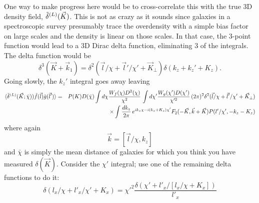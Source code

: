 \documentclass[prd,amsmath,amssymb,floatfix,superscriptaddress,nofootinbib]{revtex4-1}
\def\be{\begin{equation}}
\def\ee{\end{equation}}
\def\bea{\begin{eqnarray}}
\def\eea{\end{eqnarray}}
\newcommand{\vs}{\nonumber\\}
\begin{document}
One way to make progress here would be to cross-correlate this with the true 3D density field, $\tilde\delta^{(L)}(\vec K)$. This is not as crazy as it sounds since galaxies in a spectroscopic survey presumably trace the overdensity with a simple bias factor on large scales and the density is linear on those scales. In that case, the 3-point function would lead to a 3D Dirac delta function, eliminating 3 of the integrals. The delta function would be
\be
\delta^3(\vec K + \vec k_1) = \delta^2(\vec l/\chi + \vec l'/\chi'+\vec K_\perp) \delta(k_z+k_z'+K_z).
\ee
Going slowly, the $k_z'$ integral goes away leaving
\bea
\langle \de{L}(\vec K;\bar\chi)) \tilde f(\vec l)  \tilde g(\vec l') \rangle &=& P(K) D(\bar\chi)
\int d\chi \frac{W_f(\chi) D^2(\chi)}{\chi^2} \, \int d\chi'\frac{W_g(\chi') D(\chi')}{\chi'^2} \, (2\pi)^2  \delta^2(\vec l/\chi + \vec l'/\chi'+\vec K_\perp) 
\vs
&&\times
\int \frac{dk_z}{2\pi}\,  e^{ik_z\chi-i(k_z+K_z)\chi'}  
F_2(-\vec K,\vec k+\vec K) P(l'/\chi',-k_z-K_z) 
\eea
where again 
\be
\vec k = [\vec l/\chi,k_z]
\ee
and $\bar\chi$ is simply the mean distance of galaxies for which you think you have measured $\delta(\vec K)$.
Consider the $\chi'$ integral; use one of the remaining delta functions to do it:
\be
\delta(l_x/\chi+l'_x/\chi'+K_x) =\chi'^2 \frac{\delta(\chi'+ l'_x/[l_x/\chi+ K_x])}{l'_x}
\ee

\end{document}

